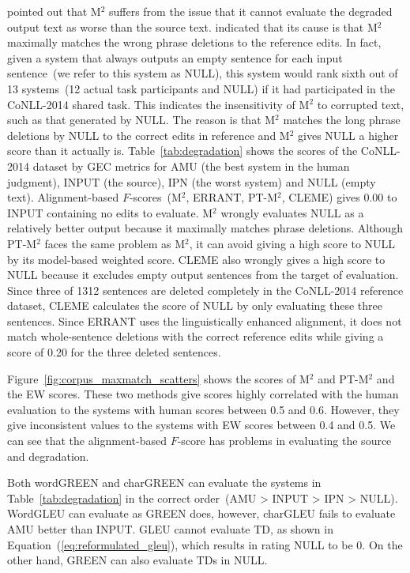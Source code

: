 \documentclass[11pt]{article}
\begin{document}
\citet{felice-briscoe-2015-towards} pointed out that M${}^2$ suffers from the issue that it cannot evaluate the degraded output text as worse than the source text.
\citet{napoles-etal-2015-ground} indicated that its cause is that M${}^2$ maximally matches the wrong phrase deletions to the reference edits.
In fact, given a system that always outputs an empty sentence for each input sentence~(we refer to this system as \textsf{NULL}), this system would rank sixth out of 13 systems~(12 actual task participants and \textsf{NULL}) if it had participated in the CoNLL-2014 shared task.
This indicates the insensitivity of M${}^2$ to corrupted text, such as that generated by \textsf{NULL}.
The reason is that M${}^2$ matches the long phrase deletions by \textsf{NULL} to the correct edits in reference and M${}^2$ gives \textsf{NULL} a higher score than it actually is.
Table~\ref{tab:degradation} shows the scores of the CoNLL-2014 dataset by GEC metrics for \textsf{AMU} (the best system in the human judgment), \textsf{INPUT} (the source), \textsf{IPN} (the worst system) and \textsf{NULL} (empty text).
Alignment-based $F$-scores~(M${}^2$, ERRANT, PT-M${}^2$, CLEME) gives 0.00 to \textsf{INPUT} containing no edits to evaluate.
M${}^2$ wrongly evaluates \textsf{NULL} as a relatively better output because it maximally matches phrase deletions.
Although PT-M${}^2$ faces the same problem as M${}^2$, it can avoid giving a high score to \textsf{NULL} by its model-based weighted score.
CLEME also wrongly gives a high score to \textsf{NULL} because it excludes empty output sentences from the target of evaluation.
Since three of 1312 sentences are deleted completely in the CoNLL-2014 reference dataset, CLEME calculates the score of \textsf{NULL} by only evaluating these three sentences.
Since ERRANT uses the linguistically enhanced alignment, it does not match whole-sentence deletions with the correct reference edits while giving a score of 0.20 for the three deleted sentences.

Figure~\ref{fig:corpus_maxmatch_scatters} shows the scores of M${}^2$ and PT-M${}^2$ and the EW scores.
These two methods give scores highly correlated with the human evaluation to the systems with human scores between 0.5 and 0.6.
However, they give inconsistent values to the systems with EW scores between 0.4 and 0.5.
We can see that the alignment-based $F$-score has problems in evaluating the source and degradation.

Both wordGREEN and charGREEN can evaluate the systems in Table~\ref{tab:degradation} in the correct order~(\textsf{AMU} > \textsf{INPUT} > \textsf{IPN} > \textsf{NULL}).
WordGLEU can evaluate as GREEN does, however, charGLEU fails to evaluate \textsf{AMU} better than \textsf{INPUT}.
GLEU cannot evaluate \textsf{TD}, as shown in Equation~(\ref{eq:reformulated_gleu}), which results in rating \textsf{NULL} to be 0.
On the other hand, GREEN can also evaluate \textsf{TD}s in \textsf{NULL}.
\end{document}
